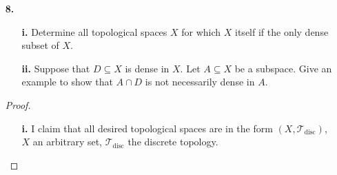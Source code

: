 \documentclass[ 12pt ]{article}
\begin{document}
\begin{enumerate}
\begin{proof}
			Now we must show that $\mathcal{T}_1 \subset \mathcal{T}_2$. It is quite clear that $\mathcal{T}_1 \subseteq \mathcal{T}_2$ as the definition of the $K$-topology includes
			the basis of the Euclidean topology in its own. Suppose by contradiction that $\mathcal{T}_1 \supseteq \mathcal{T}_2$. Then, let $0 \in  (a, b) \setminus K$ be a basis
			element of $\mathcal{T}_2$. It must hold that there exists a basis element $(c, d) \in \mathcal{T}_1$ such that $0 \in (c, d) \subseteq (a, b) \setminus K$. Therefore, $d
			> 0$, but there exists a value $\frac{1}{n} \in K$ where $\frac{1}{n} < d$, a contradiction to the fact that $(c, d) \subseteq (a, b)$.

			Finally, we show that $\mathcal{T}_2 \subset \mathcal{T}_4$. We consider two cases, a basis element in the form $(a, b) \in \mathcal{T}_2$ or $(a, b) \setminus K \in
			\mathcal{T}$. Let $x \in (a, b) \in \mathcal{T}_2$ be a point in a basis element of $\mathcal{T}_2$. Then $x \in (a, x] \subseteq (a, b)$ where $(a, x] \in \mathcal{T}_4$
			is a basis element of $\mathcal{T}_4$. For the latter case, suppose $x \in (a, b) \setminus K \in \mathcal{T}_2$ where $(a, b) \setminus K \neq (a, b)$ otherwise falling into
			the first case; that is $(a, b) \cap K \neq \varnothing$. If $x > 0$, then there must exist an $n \in \mathbb{N}$ such that $\frac{1}{n+1} < x < \frac{1}{n}$; in this case, we
			can take $x \in \left( \frac{1}{n+1}, x\right] \subseteq (a, b) \setminus K$. Any other value of $x$ can be simplified to the first case. To show that lack of equality, consider
			a basis element $x \in (a, x] \in \mathcal{T}_4$. It is clear that there exists no basis element $(a, b) \in \mathcal{T}_2$ such that $x \in (a, b) \subseteq (1, x]$. Thus,
			concluding the proof. 
		\end{proof}


	\item[\textbf{8.}] $ $
		\begin{enumerate}
			\item[\textbf{i.}] Determine all topological spaces $X$ for which $X$ itself if the only dense subset of $X$. 
			\item[\textbf{ii.}] Suppose that $D \subseteq X$ is dense in $X$. Let $A \subseteq X$ be a subspace. Give an example to show that $A \cap D$ is not necessarily dense in $A$.
		\end{enumerate}

		\begin{proof}
			\begin{enumerate}
				\item[\textbf{i.}] I claim that all desired topological spaces are in the form $(X, \mathcal{T}_{\mathrm{disc}})$, $X$ an arbitrary set, $\mathcal{T}_{\mathrm{disc}}$ the
					discrete topology.


\end{enumerate}
\end{proof}
\end{enumerate}
\end{document}
